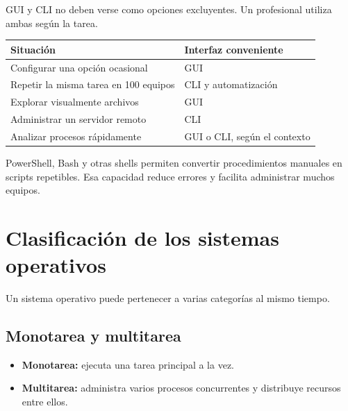 \documentclass[
  spanish,
  letterpaper,
]{scrbook}
\newcounter{none} %
\providecommand{\tightlist}{%
  \setlength{\itemsep}{0pt}\setlength{\parskip}{0pt}}
\begin{document}
GUI y CLI no deben verse como opciones excluyentes. Un profesional
utiliza ambas según la tarea.

{\def\LTcaptype{none} %
\begin{longtable}[]{@{}ll@{}}
\toprule\noalign{}
Situación & Interfaz conveniente \\
\midrule\noalign{}
\endhead
\bottomrule\noalign{}
\endlastfoot
Configurar una opción ocasional & GUI \\
Repetir la misma tarea en 100 equipos & CLI y automatización \\
Explorar visualmente archivos & GUI \\
Administrar un servidor remoto & CLI \\
Analizar procesos rápidamente & GUI o CLI, según el contexto \\
\end{longtable}
}

\begin{tcolorbox}[enhanced jigsaw, arc=.35mm, bottomrule=.15mm, bottomtitle=1mm, breakable, colback=white, colbacktitle=quarto-callout-tip-color!10!white, colframe=quarto-callout-tip-color-frame, coltitle=black, left=2mm, leftrule=.75mm, opacityback=0, opacitybacktitle=0.6, rightrule=.15mm, title=\textcolor{quarto-callout-tip-color}{\faLightbulb}\hspace{0.5em}{En la práctica profesional}, titlerule=0mm, toprule=.15mm, toptitle=1mm]

PowerShell, Bash y otras shells permiten convertir procedimientos
manuales en scripts repetibles. Esa capacidad reduce errores y facilita
administrar muchos equipos.

\end{tcolorbox}


\chapter{Clasificación de los sistemas
operativos}\label{clasificaciuxf3n-de-los-sistemas-operativos}

Un sistema operativo puede pertenecer a varias categorías al mismo
tiempo.

\section{Monotarea y multitarea}\label{monotarea-y-multitarea}

\begin{itemize}
\tightlist
\item
  \textbf{Monotarea:} ejecuta una tarea principal a la vez.
\item
  \textbf{Multitarea:} administra varios procesos concurrentes y
  distribuye recursos entre ellos.
\end{itemize}
\end{document}
